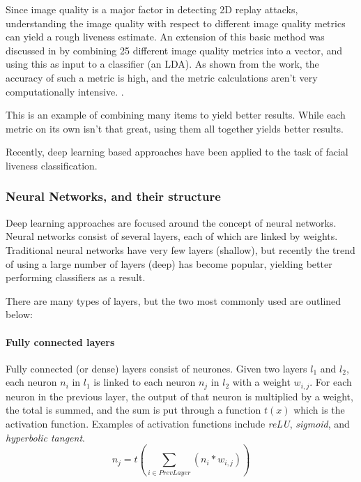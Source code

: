 \documentclass[10pt,a4paper]{article}
\begin{document}
        Since image quality is a major factor in detecting 2D replay attacks, understanding the image quality with respect to different image quality metrics can yield a rough liveness estimate.
        An extension of this basic method was discussed in \cite{ImageQualityAssessmentTest} by combining 25 different image quality metrics into a vector, and using this as input to a classifier (an LDA).
        As shown from the work, the accuracy of such a metric is high, and the metric calculations aren't very computationally intensive. \cite{ImageQualityAssessmentTest}.
        
        This is an example of combining many items to yield better results. While each metric on its own isn't that great, using them all together yields better results.
        
        Recently, deep learning based approaches have been applied to the task of facial liveness classification.


        \subsubsection{Neural Networks, and their structure}
        Deep learning approaches are focused around the concept of neural networks. Neural networks consist of several layers, each of which are linked by weights.
        Traditional neural networks have very few layers (shallow), but recently the trend of using a large number of layers (deep) has become popular, yielding
        better performing classifiers as a result.

        There are many types of layers, but the two most commonly used are outlined below:

        \paragraph{Fully connected layers} Fully connected (or dense) layers consist of neurones. Given two layers $l_1$ and $l_2$, each
        neuron $n_i$ in $l_1$ is linked to each neuron $n_j$ in $l_2$ with a weight $w_{i, j}$. For each neuron in the previous layer, the output of that neuron is multiplied by a weight, the total is summed,
        and the sum is put through a function $t(x)$ which is the activation function. Examples of activation functions include \emph{reLU}, \emph{sigmoid}, and \emph{hyperbolic tangent}.
        $$n_j = t(\sum_{i \in PrevLayer}(n_i * w_{i, j}))$$
\end{document}
